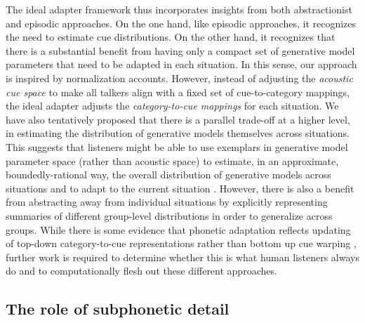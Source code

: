 \label{r1-shi-et-al}
The ideal adapter framework thus incorporates insights from both abstractionist and episodic approaches.  On the one hand, like episodic approaches, it recognizes the need to estimate cue distributions.  On the other hand, it recognizes that there is a substantial benefit from having only a compact set of generative model parameters that need to be adapted in each situation.
In this sense, our approach is inspired by normalization accounts.  However, instead of adjusting the \emph{acoustic cue space} to make all talkers align with a fixed set of cue-to-category mappings, the ideal adapter adjusts the \emph{category-to-cue mappings} for each situation.
We have also tentatively proposed that there is a parallel trade-off at a higher level, in estimating the distribution of generative models themselves across situations.  This suggests that listeners might be able to use exemplars in generative model parameter space (rather than acoustic space) to estimate, in an approximate, boundedly-rational way, the overall distribution of generative models across situations \cite{Ashby1995,Gibson2013,Griffiths2008} and to adapt to the current situation \cite{Shi2010}.  However, there is also a benefit from abstracting away from individual situations by explicitly representing summaries of different group-level distributions in order to generalize across groups.  While there is some evidence that phonetic adaptation reflects updating of top-down category-to-cue representations rather than bottom up cue warping \cite{Dahan2008}, further work is required to determine whether this is  what human listeners always do and to computationally flesh out these different approaches.

\subsection{The role of subphonetic detail}
\label{sec:impl-role-subph}

